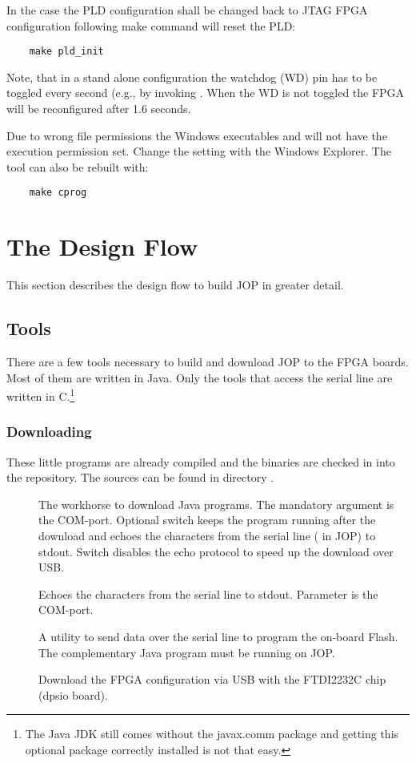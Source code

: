 In the case the PLD configuration shall be changed back to JTAG FPGA
configuration following make command will reset the PLD:
\begin{verbatim}
    make pld_init
\end{verbatim}

Note, that in a stand alone configuration the watchdog (WD) pin has
to be toggled every second (e.g., by invoking .
When the WD is not toggled the FPGA will be reconfigured after 1.6
seconds.

Due to wrong file permissions the Windows executables 
and  will not have the execution permission set.
Change the setting with the Windows Explorer. The tool 
can also be rebuilt with:
\begin{verbatim}
    make cprog
\end{verbatim}


\section{The Design Flow}

This section describes the design flow to build JOP in greater
detail.

\subsection{Tools}

There are a few tools necessary to build and download JOP to the FPGA
boards. Most of them are written in Java. Only the tools that access
the serial line are written in C.\footnote{The Java JDK still comes
without the javax.comm package and getting this optional package
correctly installed is not that easy.}

\subsubsection{Downloading}

These little programs are already compiled and the binaries are
checked in into the repository. The sources can be found in directory
.

\begin{description}
    \item[] The workhorse to download Java programs. The
    mandatory argument is the COM-port. Optional switch 
    keeps the program running after the download and echoes the
    characters from the serial line ( in JOP) to
    stdout. Switch  disables the echo protocol to speed up the
    download over USB.
    \item[] Echoes the characters from the serial line
        to stdout. Parameter is the COM-port.
    \item[] A utility to send data over the serial
        line to program the on-board Flash. The complementary
        Java program  must be running on JOP.
    \item[] Download the FPGA configuration via
    USB with the FTDI2232C chip (dpsio board).
\end{description}

